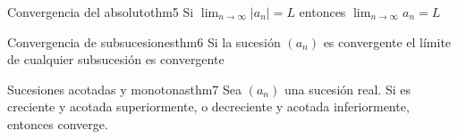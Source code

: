 \begin{teorema}{Convergencia del absoluto}{thm5}
    Si $\lim_{n \to \infty} \lvert a_n \rvert = L$ entonces $\lim_{n \to \infty} a_n = L$
\end{teorema}

\begin{teorema}{Convergencia de subsucesiones}{thm6}
    Si la sucesión $(a_n)$ es convergente el límite de cualquier subsucesión es convergente
\end{teorema}

\begin{teorema}{Sucesiones acotadas y monotonas}{thm7}
    Sea $(a_n)$ una sucesión real. 
    Si es creciente y acotada superiormente, o decreciente y acotada inferiormente, entonces converge.
\end{teorema}

